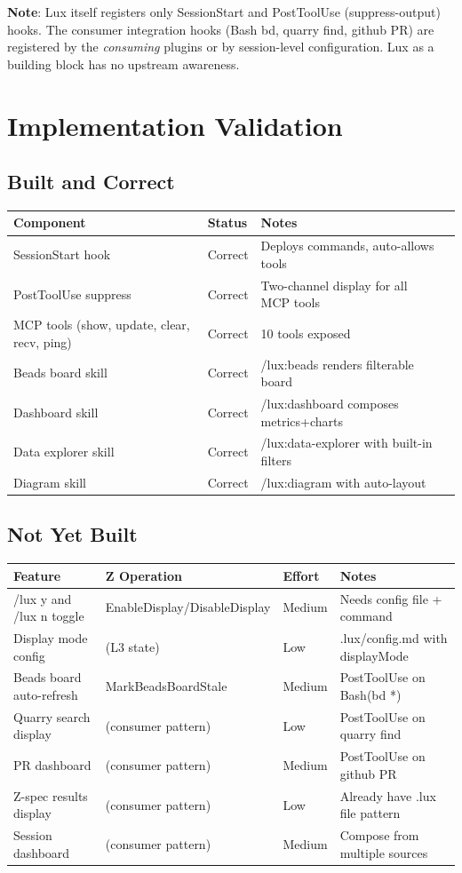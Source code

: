 \documentclass[a4paper,10pt,fleqn]{article}
\begin{document}
\textbf{Note}: Lux itself registers only SessionStart and PostToolUse
(suppress-output) hooks. The consumer integration hooks (Bash bd,
quarry find, github PR) are registered by the \emph{consuming} plugins
or by session-level configuration. Lux as a building block has no
upstream awareness.

\section{Implementation Validation}

\subsection{Built and Correct}

\begin{tabular}{llll}
\hline
\textbf{Component} & \textbf{Status} & \textbf{Notes} \\
\hline
SessionStart hook & Correct & Deploys commands, auto-allows tools \\
PostToolUse suppress & Correct & Two-channel display for all MCP tools \\
MCP tools (show, update, clear, recv, ping) & Correct & 10 tools exposed \\
Beads board skill & Correct & /lux:beads renders filterable board \\
Dashboard skill & Correct & /lux:dashboard composes metrics+charts \\
Data explorer skill & Correct & /lux:data-explorer with built-in filters \\
Diagram skill & Correct & /lux:diagram with auto-layout \\
\hline
\end{tabular}

\subsection{Not Yet Built}

\begin{tabular}{llll}
\hline
\textbf{Feature} & \textbf{Z Operation} & \textbf{Effort} & \textbf{Notes} \\
\hline
/lux y and /lux n toggle & EnableDisplay/DisableDisplay & Medium & Needs config file + command \\
Display mode config & (L3 state) & Low & .lux/config.md with displayMode \\
Beads board auto-refresh & MarkBeadsBoardStale & Medium & PostToolUse on Bash(bd *) \\
Quarry search display & (consumer pattern) & Low & PostToolUse on quarry find \\
PR dashboard & (consumer pattern) & Medium & PostToolUse on github PR \\
Z-spec results display & (consumer pattern) & Low & Already have .lux file pattern \\
Session dashboard & (consumer pattern) & Medium & Compose from multiple sources \\
\hline
\end{tabular}
\end{document}
